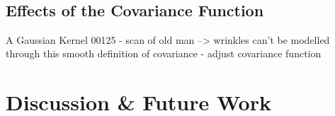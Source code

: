 \begin{figure}[h!]
    \\
   \caption{}
\label{fig:caricature}
\end{figure}

\subsection{Effects of the Covariance Function}
A Gaussian Kernel
00125 - scan of old man --> wrinkles can't be modelled through this smooth definition of covariance - adjust covariance function
\section{Discussion \& Future Work}

